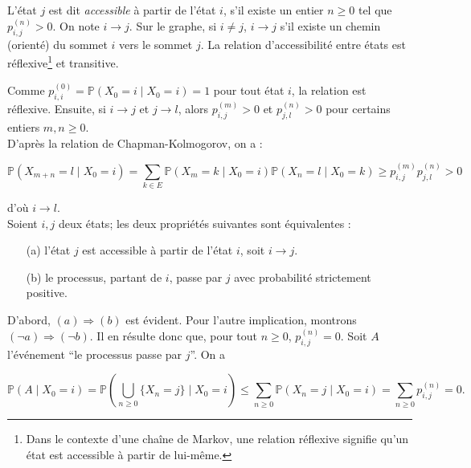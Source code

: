 \begin{sloppypar}
\begin{tcolorbox}[colback=blue!5!white,colframe=blue!75!black,title=Définition]
L’état $j$ est dit \emph{accessible} à partir de l’état $i$, s’il existe un entier $n \geq 0$ tel que $p^{(n)}_{i,j} > 0$. On note $i \rightarrow j$. Sur le graphe, si $i \neq j$, $i \rightarrow j$ s’il existe un chemin (orienté) du sommet $i$ vers le sommet $j$. La relation d’accessibilité entre états est réflexive\footnote{Dans le contexte d'une chaîne de Markov, une relation réflexive signifie qu'un état est accessible à partir de lui-même.} et transitive.
\end{tcolorbox}

Comme $p^{(0)}_{i,i} = \mathbb{P}(X_0 = i \mid X_0 = i) = 1$ pour tout état $i$, la relation est réflexive. Ensuite, si $i \rightarrow j$ et $j \rightarrow l$, alors $p^{(m)}_{i,j} > 0$ et $p^{(n)}_{j,l} > 0$ pour certains entiers $m, n \geq 0$.\\

D'après la relation de Chapman-Kolmogorov, on a :

\begin{equation}
 \mathbb{P}(X_{m+n} = l \mid X_0 = i) = \sum_{k \in E} \mathbb{P}(X_m = k \mid X_0 = i) \mathbb{P}(X_n = l \mid X_0 = k) \geq p^{(m)}_{i,j} p^{(n)}_{j,l} > 0   
\end{equation}

d'où $i \rightarrow l$.\\

Soient $i, j$ deux états; les deux propriétés suivantes sont équivalentes :

\begin{enumerate}
    \item[(a)] l’état $j$ est accessible à partir de l’état $i$, soit $i \rightarrow j$.
    \item[(b)] le processus, partant de $i$, passe par $j$ avec probabilité strictement positive.
\end{enumerate}

D'abord, $(a) \Rightarrow (b)$ est évident. Pour l’autre implication, montrons $(\neg a) \Rightarrow (\neg b)$. Il en résulte donc que, pour tout $n \geq 0$, $p^{(n)}_{i,j} = 0$. Soit $A$ l’événement “le processus passe par $j$”. On a

\begin{equation}
  \mathbb{P}(A \mid X_0 = i) = \mathbb{P}\left(\bigcup_{n \geq 0} \{X_n = j\} \mid X_0 = i\right) \leq \sum_{n \geq 0} \mathbb{P}(X_n = j \mid X_0 = i) = \sum_{n \geq 0} p^{(n)}_{i,j} = 0.  
\end{equation}


\end{sloppypar}

